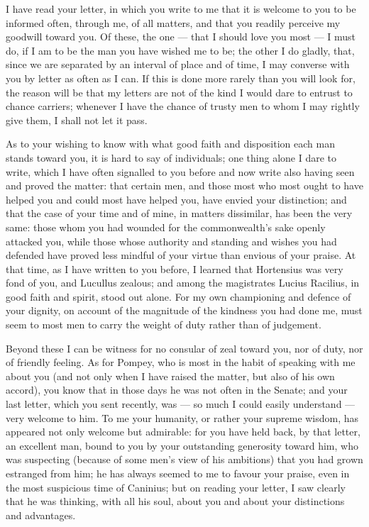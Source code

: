 

 I have read your letter, in which you write to me that it is welcome to you to be informed often, through me, of all matters, and that you readily perceive my goodwill toward you. Of these, the one --- that I should love you most --- I must do, if I am to be the man you have wished me to be; the other I do gladly, that, since we are separated by an interval of place and of time, I may converse with you by letter as often as I can. If this is done more rarely than you will look for, the reason will be that my letters are not of the kind I would dare to entrust to chance carriers; whenever I have the chance of trusty men to whom I may rightly give them, I shall not let it pass.

 As to your wishing to know with what good faith and disposition each man stands toward you, it is hard to say of individuals; one thing alone I dare to write, which I have often signalled to you before and now write also having seen and proved the matter: that certain men, and those most who most ought to have helped you and could most have helped you, have envied your distinction; and that the case of your time and of mine, in matters dissimilar, has been the very same: those whom you had wounded for the commonwealth's sake openly attacked you, while those whose authority and standing and wishes you had defended have proved less mindful of your virtue than envious of your praise. At that time, as I have written to you before, I learned that Hortensius was very fond of you, and Lucullus zealous; and among the magistrates Lucius Racilius, in good faith and spirit, stood out alone. For my own championing and defence of your dignity, on account of the magnitude of the kindness you had done me, must seem to most men to carry the weight of duty rather than of judgement.

 Beyond these I can be witness for no consular of zeal toward you, nor of duty, nor of friendly feeling. As for Pompey, who is most in the habit of speaking with me about you (and not only when I have raised the matter, but also of his own accord), you know that in those days he was not often in the Senate; and your last letter, which you sent recently, was --- so much I could easily understand --- very welcome to him. To me your humanity, or rather your supreme wisdom, has appeared not only welcome but admirable: for you have held back, by that letter, an excellent man, bound to you by your outstanding generosity toward him, who was suspecting (because of some men's view of his ambitions) that you had grown estranged from him; he has always seemed to me to favour your praise, even in the most suspicious time of Caninius; but on reading your letter, I saw clearly that he was thinking, with all his soul, about you and about your distinctions and advantages.

